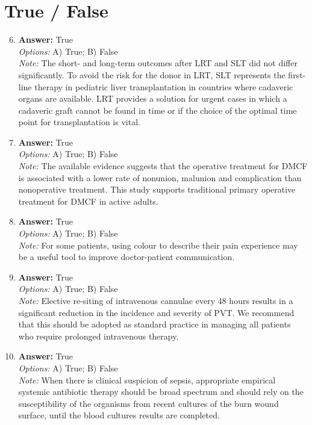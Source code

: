 \documentclass[12pt]{article}
\begin{document}
\section*{True / False}
\begin{enumerate}[label=\arabic*.]
\setcounter{enumi}{5}
\item \textbf{Answer:} True
\\ \textit{Options:} A) True; B) False
\\ \textit{Note:} The short- and long-term outcomes after LRT and SLT did not differ significantly. To avoid the risk for the donor in LRT, SLT represents the first-line therapy in pediatric liver transplantation in countries where cadaveric organs are available. LRT provides a solution for urgent cases in which a cadaveric graft cannot be found in time or if the choice of the optimal time point for transplantation is vital.
\item \textbf{Answer:} True
\\ \textit{Options:} A) True; B) False
\\ \textit{Note:} The available evidence suggests that the operative treatment for DMCF is associated with a lower rate of nonunion, malunion and complication than nonoperative treatment. This study supports traditional primary operative treatment for DMCF in active adults.
\item \textbf{Answer:} True
\\ \textit{Options:} A) True; B) False
\\ \textit{Note:} For some patients, using colour to describe their pain experience may be a useful tool to improve doctor-patient communication.
\item \textbf{Answer:} True
\\ \textit{Options:} A) True; B) False
\\ \textit{Note:} Elective re-siting of intravenous cannulae every 48 hours results in a significant reduction in the incidence and severity of PVT. We recommend that this should be adopted as standard practice in managing all patients who require prolonged intravenous therapy.
\item \textbf{Answer:} True
\\ \textit{Options:} A) True; B) False
\\ \textit{Note:} When there is clinical suspicion of sepsis, appropriate empirical systemic antibiotic therapy should be broad spectrum and should rely on the susceptibility of the organisms from recent cultures of the burn wound surface, until the blood cultures results are completed.
\end{enumerate}
\end{document}
